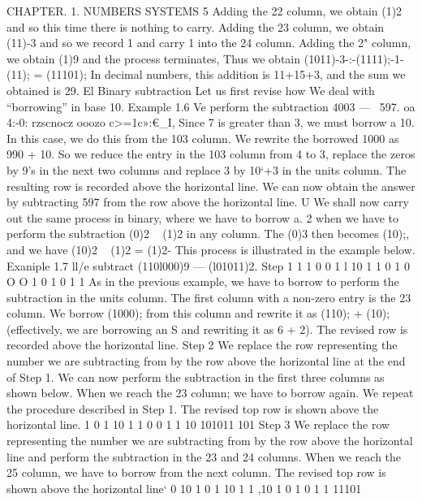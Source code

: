 CHAPTER. 1. NUMBERS SYSTEMS 5
Adding the 22 column, we obtain (1)2 and so this time there is nothing to carry. Adding the
23 column, we obtain (11)-3 and so we record 1 and carry 1 into the 24 column. Adding the
2" column, we obtain (1)9 and the process terminates,
Thus we obtain (1011)-3-:-(1111);-1-(11); = (11101); In decimal numbers, this addition is 11+15+3,
and the sum we obtained is 29. El
Binary subtraction
Let us first revise how We deal with “borrowing” in base 10.
Example 1.6 \¢Ve perform the subtraction 4003 —~ 597.
oa 4:-0:
rzscnocz
ooozo
c>=1c»:€_I,
Since 7 is greater than 3, we must borrow a 10. In this case, we do this from the 103 column. We
rewrite the borrowed 1000 as 990 + 10. So we reduce the entry in the 103 column from 4 to 3,
replace the zeros by 9’s in the next two columns and replace 3 by 10‘+3 in the units column. The
resulting row is recorded above the horizontal line. We can now obtain the answer by subtracting
597 from the row above the horizontal line. U
We shall now carry out the same process in binary, where we have to borrow a. 2 when we have to
perform the subtraction (0)2 ~ (1)2 in any column. The (0)3 then becomes (10);, and we have
(10)2 ~ (1)2 = (1)2-
This process is illustrated in the example below.
Exaniple 1.7 ll/e subtract (110l000)9 — (l01011)2.
Step 1
1 1 0 0 1 l 10
1 1 0 1 0 O O
1 0 1 0 1 1
As in the previous example, we have to borrow to perform the subtraction in the units
column. The ﬁrst column with a non-zero entry is the 23 column. We borrow (1000); from
this column and rewrite it as (110); + (10); (effectively, we are borrowing an S and rewriting
it as 6 + 2). The revised row is recorded above the horizontal line.
Step 2 We replace the row representing the number we are subtracting from by the row above
the horizontal line at the end of Step 1. We can now perform the subtraction in the ﬁrst
three columns as shown below. When we reach the 23 column; we have to borrow again. We
repeat the procedure described in Step 1. The revised top row is shown above the horizontal
line.
1 0 1 10
1 1 0 0 1 1 10
101011
101
Step 3 We replace the row representing the number we are subtracting from by the row above
the horizontal line and perform the subtraction in the 23 and 24 columns. When we reach
the 25 column, we have to borrow from the next column. The revised top row is shown above
the horizontal line‘
0 10
1 0 1 10 1 1 ,10
1 0 1 0 1 1
11101







